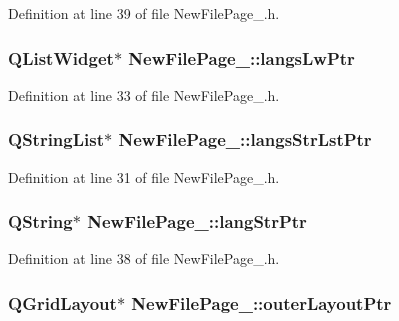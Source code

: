 Definition at line 39 of file New\-File\-Page\-\_.\-h.

\hypertarget{class_new_file_page__1_a33c1a3f115a92a04b0f7344cd1b14a57}{
\subsubsection[{langs\-Lw\-Ptr}]{\setlength{\rightskip}{0pt plus 5cm}Q\-List\-Widget$\ast$ New\-File\-Page\-\_\-::langs\-Lw\-Ptr\hspace{0.3cm}{\ttfamily [private]}}}\label{class_new_file_page__1_a33c1a3f115a92a04b0f7344cd1b14a57}


Definition at line 33 of file New\-File\-Page\-\_.\-h.

\hypertarget{class_new_file_page__1_acb912634d0accb1d1fc2cb1f5c2dea78}{
\subsubsection[{langs\-Str\-Lst\-Ptr}]{\setlength{\rightskip}{0pt plus 5cm}Q\-String\-List$\ast$ New\-File\-Page\-\_\-::langs\-Str\-Lst\-Ptr\hspace{0.3cm}{\ttfamily [private]}}}\label{class_new_file_page__1_acb912634d0accb1d1fc2cb1f5c2dea78}


Definition at line 31 of file New\-File\-Page\-\_.\-h.

\hypertarget{class_new_file_page__1_a28c75fb5624badef97ed17d38f0c598a}{
\subsubsection[{lang\-Str\-Ptr}]{\setlength{\rightskip}{0pt plus 5cm}Q\-String$\ast$ New\-File\-Page\-\_\-::lang\-Str\-Ptr\hspace{0.3cm}{\ttfamily [private]}}}\label{class_new_file_page__1_a28c75fb5624badef97ed17d38f0c598a}


Definition at line 38 of file New\-File\-Page\-\_.\-h.

\hypertarget{class_new_file_page__1_a161e24cf061ed28e5ee5f61e5087a9fc}{
\subsubsection[{outer\-Layout\-Ptr}]{\setlength{\rightskip}{0pt plus 5cm}Q\-Grid\-Layout$\ast$ New\-File\-Page\-\_\-::outer\-Layout\-Ptr\hspace{0.3cm}{\ttfamily [private]}}}\label{class_new_file_page__1_a161e24cf061ed28e5ee5f61e5087a9fc}


